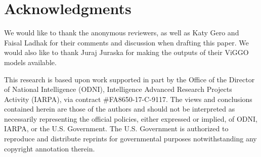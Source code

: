 \section*{Acknowledgments}

We would like to thank the anonymous reviewers, as well as Katy Gero and Faisal Ladhak
for their comments and discussion when drafting this paper. 
We would also like to thank Juraj Juraska for making the outputs of their ViGGO
models available. 

This research is based upon work supported in
part by the Office of the Director of National Intelligence (ODNI), Intelligence Advanced Research
Projects Activity (IARPA), via contract \#FA8650-17-C-9117. The views and conclusions contained
herein are those of the authors and should not be
interpreted as necessarily representing the official
policies, either expressed or implied, of ODNI,
IARPA, or the U.S. Government. The U.S. Government is authorized to reproduce and distribute
reprints for governmental purposes notwithstanding any copyright annotation therein.

